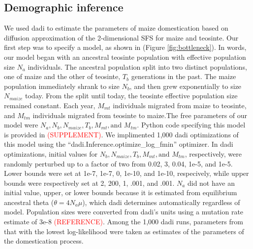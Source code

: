 \documentclass{pnastwo}
\begin{document}
\begin{article}
\begin{materials}
\subsection{Demographic inference}
We used dadi \cite{gutenkunst2009} to estimate the parameters of maize
domestication based on diffusion approximation of the 2-dimensional
SFS for maize and teosinte. Our first step was to specify a model, as
shown in (Figure \ref{fig:bottleneck}). In words, our model began with an ancestral teosinte
population with effective population size $N_a$ individuals. The
ancestral population split into
two distinct populations, one of maize and the other of teosinte,
$T_b$ generations in the past. The maize population immediately shrank
to size $N_b$, and then grew exponentially to size $N_{maize}$
today. From the split until today, the teosinte effective population
size remained constant. Each year, $M_{mt}$ individuals migrated from
maize to teosinte, and $M_{tm}$ individuals migrated from teosinte to
maize.The free parameters of our model were $N_a, N_b, N_{maize}, T_b,
M_{mt}, \text{and } M_{tm} $. Python code specifying this model is
provided in \textcolor{red}{(SUPPLEMENT)}. We implimented 1,000 dadi
optimizations of this model using the ``dadi.Inference.optimize\_log\_fmin''
optimizer. In dadi optimizations,
initial values for $N_b, N_{maize}, T_b,
M_{mt}, \text{and } M_{tm}$, respectively, were randomly perturbed up
to a factor of two from 0.02, 3, 0.04, 1e-5, and 1e-5. Lower
bounds were set at 1e-7, 1e-7,  0, 1e-10, and
1e-10, respecively, while upper bounds were respectively set at 2,
200, 1, .001, and .001. $N_a$ did not have an initial value, upper, or
lower bounds because it is estimated from equilibrium ancestral theta
($\theta = 4N_a\mu$), which dadi determines automatically regardless
of model. Population sizes were converted from dadi's
units using a mutation rate estimate of 3e-8
\textcolor{red}{(REFERENCE)}. Among the 1,000 dadi runs, parameters
from that with the lowest log-likelihood were taken as estimates of
the parameters of the domestication process.


\end{materials}
\end{article}
\end{document}
